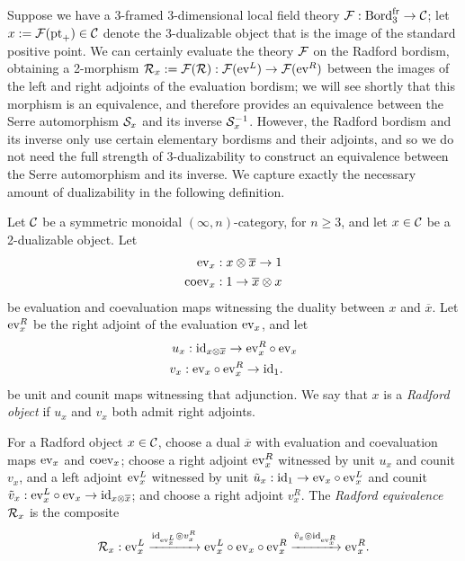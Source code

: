 \documentclass{amsart}
\begin{document}
Suppose we have a 3-framed 3-dimensional local field theory $\mathcal F: \mathrm{Bord}^\mathrm{fr}_3 \rightarrow \mathcal C$; let $x:=\mathcal F(\mathrm{pt}_+) \in \mathcal C$ denote the 3-dualizable object that is the image of the standard positive point.  We can certainly evaluate the theory $\mathcal F$ on the Radford bordism, obtaining a 2-morphism $\mathcal R_x := \mathcal F(\mathcal R) : \mathcal F(\mathrm{ev}^L) \rightarrow \mathcal F(\mathrm{ev}^R)$ between the images of the left and right adjoints of the evaluation bordism; we will see shortly that this morphism is an equivalence, and therefore provides an equivalence between the Serre automorphism $\mathcal S_x$ and its inverse $\mathcal S_x^{-1}$.  However, the Radford bordism and its inverse only use certain elementary bordisms and their adjoints, and so we do not need the full strength of 3-dualizability to construct an equivalence between the Serre automorphism and its inverse.  We capture exactly the necessary amount of dualizability in the following definition.
\begin{definition} \label{def:Radford-Object}
Let $\mathcal C$ be a symmetric monoidal $(\infty,n)$-category, for $n \geq 3$, and let $x \in \mathcal C$ be a 2-dualizable object.  Let
	\begin{align*}
		\mathrm{ev}_x: & \; x \otimes \overline{x} \to 1 \\
		\mathrm{coev}_x: & \;  1 \to  \overline{x} \otimes x
	\end{align*}
be evaluation and coevaluation maps witnessing the duality between $x$ and $\overline{x}$.  Let $\mathrm{ev}_x^R$ be the right adjoint of the evaluation $\mathrm{ev}_x$, and let
	\begin{align*}
		u_x: & \;  \mathrm{id}_{x \otimes \overline{x}} \to \mathrm{ev}_x^R \circ \mathrm{ev}_x \\
		v_x: \; & \mathrm{ev}_x \circ \mathrm{ev}_x^R \to \mathrm{id}_1. 
	\end{align*}
be unit and counit maps witnessing that adjunction.  We say that $x$ is a \emph{Radford object} if $u_x$ and $v_x$ both admit right adjoints.
\end{definition}
\begin{definition} \label{def:radfordequiv}
For a Radford object $x \in \mathcal C$, choose a dual $\overline{x}$ with evaluation and coevaluation maps $\mathrm{ev}_x$ and $\mathrm{coev}_x$; choose a right adjoint $\mathrm{ev}_x^R$ witnessed by unit $u_x$ and counit $v_x$, and a left adjoint $\mathrm{ev}_x^L$ witnessed by unit $\tilde{u}_x : \mathrm{id}_1 \rightarrow \mathrm{ev}_x \circ \mathrm{ev}_x^L$ and counit $\tilde{v}_x: \mathrm{ev}_x^L \circ \mathrm{ev}_x \rightarrow \mathrm{id}_{x \otimes \overline{x}}$; and choose a right adjoint $v_x^R$.  The \emph{Radford equivalence} $\mathcal R_x$ is the composite
\[
\mathcal R_x: \mathrm{ev}_x^L \xrightarrow{\mathrm{id}_{\mathrm{ev}_x^L} \circledcirc v_x^R} \mathrm{ev}_x^L \circ \mathrm{ev}_x \circ \mathrm{ev}_x^R \xrightarrow{\tilde{v}_x \circledcirc \mathrm{id}_{\mathrm{ev}_x^R}} \mathrm{ev}_x^R.
\]
\end{definition} \vspace{8pt}
\end{document}
